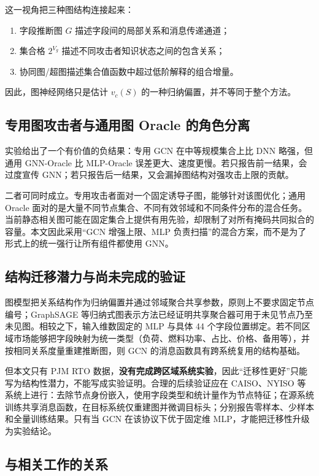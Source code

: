 \documentclass[UTF8,a4paper,zihao=5,fontset=fandol]{ctexart}
\begin{document}
这一视角把三种图结构连接起来：
\begin{enumerate}
  \item 字段推断图 $G$ 描述字段间的局部关系和消息传递通道；
  \item 集合格 $2^{V_g}$ 描述不同攻击者知识状态之间的包含关系；
  \item 协同图/超图描述集合值函数中超过低阶解释的组合增量。
\end{enumerate}
因此，图神经网络只是估计 $v_c(S)$ 的一种归纳偏置，并不等同于整个方法。

\subsection{专用图攻击者与通用图 Oracle 的角色分离}

实验给出了一个有价值的负结果：专用 GCN 在中等规模集合上比 DNN 略强，但通用 GNN-Oracle 比 MLP-Oracle 误差更大、速度更慢。若只报告前一结果，会过度宣传 GNN；若只报告后一结果，又会漏掉图结构对强攻击上限的贡献。

二者可同时成立。专用攻击者面对一个固定诱导子图，能够针对该图优化；通用 Oracle 面对的是大量不同节点集合、不同有效邻域和不同条件分布的混合任务。当前静态相关图可能在固定集合上提供有用先验，却限制了对所有掩码共同拟合的容量。本文因此采用“GCN 增强上限、MLP 负责扫描”的混合方案，而不是为了形式上的统一强行让所有组件都使用 GNN。

\subsection{结构迁移潜力与尚未完成的验证}

图模型把关系结构作为归纳偏置并通过邻域聚合共享参数\citep{battaglia2018relational}，原则上不要求固定节点编号；GraphSAGE 等归纳式图表示方法已经证明共享聚合器可用于未见节点乃至未见图\citep{hamilton2017graphsage}。相较之下，输入维数固定的 MLP 与具体 44 个字段位置绑定。若不同区域市场能够把字段映射为统一类型（负荷、燃料功率、占比、价格、备用等），并按相同关系度量重建推断图，则 GCN 的消息函数具有跨系统复用的结构基础。

但本文只有 PJM RTO 数据，\textbf{没有完成跨区域系统实验}，因此“迁移性更好”只能写为结构性潜力，不能写成实验证明。合理的后续验证应在 CAISO、NYISO 等系统上进行：去除节点身份嵌入，使用字段类型和统计量作为节点特征；在源系统训练共享消息函数，在目标系统仅重建图并微调目标头；分别报告零样本、少样本和全量训练结果。只有当 GCN 在该协议下优于固定维 MLP，才能把迁移性升级为实验结论。

\subsection{与相关工作的关系}
\end{document}
